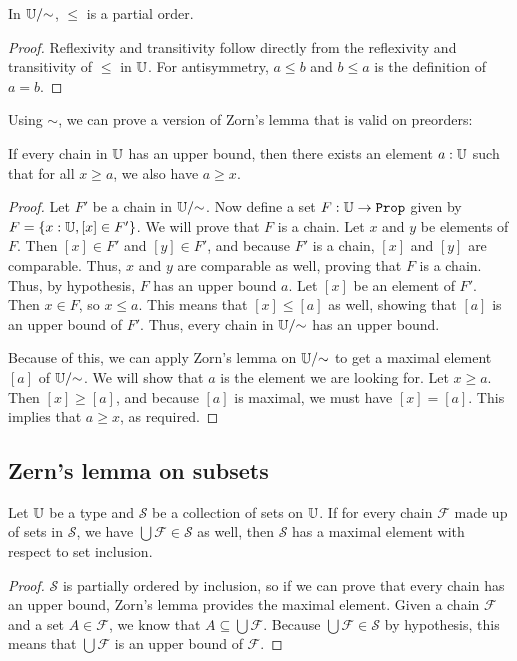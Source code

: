 \documentclass[../../math.tex]{subfiles}
\begin{document}
\begin{instance}
    In $\mathbb{U}/{\sim}$, $\leq$ is a partial order.
\end{instance}
\begin{proof}
    Reflexivity and transitivity follow directly from the reflexivity and
    transitivity of $\leq$ in $\mathbb{U}$.  For antisymmetry, $a \leq b$ and $b \leq a$
    is the definition of $a = b$.
\end{proof}

Using $\sim$, we can prove a version of Zorn's lemma that is valid on preorders:

\begin{theorem} \label{preorder_zorn}
    If every chain in $\mathbb{U}$ has an upper bound, then there exists an element $a :
    \mathbb{U}$ such that for all $x \geq a$, we also have $a \geq x$.
\end{theorem}
\begin{proof}
    Let $F'$ be a chain in $\mathbb{U}/{\sim}$.  Now define a set $F : \U \to \Prop$
    given by $F = \{x : \mathbb{U}, [x] \in F'\}$.  We will prove that $F$ is a chain.
    Let $x$ and $y$ be elements of $F$.  Then $[x] \in F'$ and $[y] \in F'$, and
    because $F'$ is a chain, $[x]$ and $[y]$ are comparable.  Thus, $x$ and $y$
    are comparable as well, proving that $F$ is a chain.  Thus, by hypothesis,
    $F$ has an upper bound $a$.  Let $[x]$ be an element of $F'$.  Then $x \in
    F$, so $x \leq a$.  This means that $[x] \leq [a]$ as well, showing that
    $[a]$ is an upper bound of $F'$.  Thus, every chain in $\mathbb{U}/{\sim}$ has an
    upper bound.

    Because of this, we can apply Zorn's lemma on $\mathbb{U}/{\sim}$ to get a maximal
    element $[a]$ of $\mathbb{U}/{\sim}$.  We will show that $a$ is the element we are
    looking for.  Let $x \geq a$.  Then $[x] \geq [a]$, and because $[a]$ is
    maximal, we must have $[x] = [a]$.  This implies that $a \geq x$, as
    required.
\end{proof}

\subsection{Zern's lemma on subsets}

\begin{theorem} \label{set_zorn}
    Let $\mathbb{U}$ be a type and $\mathcal S$ be a collection of sets on $\mathbb{U}$.  If
    for every chain $\mathcal F$ made up of sets in $\mathcal S$, we have
    $\bigcup \mathcal F \in \mathcal S$ as well, then $\mathcal S$ has a maximal
    element with respect to set inclusion.
\end{theorem}
\begin{proof}
    $\mathcal S$ is partially ordered by inclusion, so if we can prove that
    every chain has an upper bound, Zorn's lemma provides the maximal element.
    Given a chain $\mathcal F$ and a set $A \in \mathcal F$, we know that $A
    \subseteq \bigcup \mathcal F$.  Because $\bigcup \mathcal F \in \mathcal S$
    by hypothesis, this means that $\bigcup \mathcal F$ is an upper bound of
    $\mathcal F$.
\end{proof}
\end{document}
